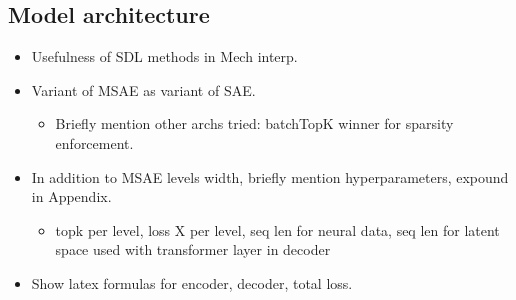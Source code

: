 \subsection{Model architecture}

\begin{itemize}
    \item Usefulness of SDL methods in Mech interp.
    
    \item Variant of MSAE as variant of SAE.
    \begin{itemize}
        \item Briefly mention other archs tried: batchTopK winner for sparsity enforcement.
    \end{itemize}
    
    \item In addition to MSAE levels width, briefly mention hyperparameters, expound in Appendix.
    \begin{itemize}
        \item topk per level, loss X per level, seq len for neural data, seq len for latent space used with transformer layer in decoder
    \end{itemize}
    
    \item Show latex formulas for encoder, decoder, total loss.
\end{itemize}